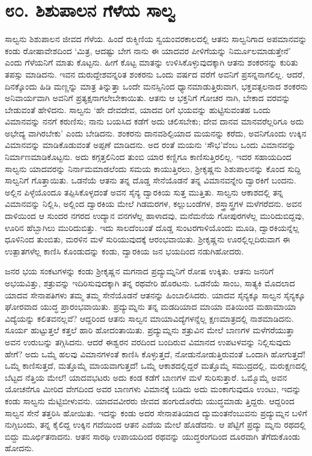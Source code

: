 
\chapter{೮೦. ಶಿಶುಪಾಲನ ಗೆಳೆಯ ಸಾಲ್ವ}

ಸಾಲ್ವನು ಶಿಶುಪಾಲನ ಜೀವದ ಗೆಳೆಯ. ಹಿಂದೆ ರುಕ್ಮಿಣಿಯ ಸ್ವಯಂವರಕಾಲದಲ್ಲಿ ಆತನು ಸಾಲ್ವನಿಗಾದ ಅಪಮಾನವನ್ನು ಕಂಡು ರೋಷಾವೇಶದಿಂದ ‘ಮಿತ್ರ, ಆದಷ್ಟು ಬೇಗ ನಾನು ಈ ಯಾದವರ ಪೀಳಿಗೆಯನ್ನು ನಿರ್ಮೂಲಮಾಡುತ್ತೇನೆ’ ಎಂದು ಗೆಳೆಯನಿಗೆ ಮಾತು ಕೊಟ್ಟನು. ಹೀಗೆ ಕೊಟ್ಟ ಮಾತನ್ನು ಉಳಿಸಿಕೊಳ್ಳುವುದಕ್ಕಾಗಿ ಆತನು ಶಂಕರನನ್ನು ಕುರಿತು ತಪಸ್ಸು ಮಾಡಿದನು. ಇವನ ದುರುದ್ದೇಶವನ್ನರಿತ ಶಂಕರನು ಒಂದು ವರ್ಷದ ವರೆಗೆ ಅವನಿಗೆ ಪ್ರಸನ್ನನಾಗಲಿಲ್ಲ. ಆದರೆ, ದಿನಕ್ಕೊಂದು ಹಿಡಿ ಮಣ್ಣನ್ನು ಮಾತ್ರ ತಿನ್ನುತ್ತಾ ಒಂದೇ ಮನಸ್ಸಿನಿಂದ ಧ್ಯಾನಮಾಡುತ್ತಿರುವಾಗ, ಭಕ್ತವತ್ಸಲನಾದ ಶಂಕರನು ಅನಿವಾರ್ಯವಾಗಿ ಅವನಿಗೆ ಪ್ರತ್ಯಕ್ಷನಾಗಲೇಬೇಕಾಯಿತು. ಆತನು ಆ ಭಕ್ತನಿಗೆ ಗೋಚರ ನಾಗಿ, ಬೇಕಾದ ವರವನ್ನು ಬೇಡುವಂತೆ ಹೇಳಿದನು. ಸಾಲ್ವನು ‘ಹೇ ದೇವದೇವ, ಯಾದವ ರಿಗೆ ಭಯವನ್ನು ಹುಟ್ಟಿಸುವಂತಹ ಒಂದು ವಿಮಾನವನ್ನು ನನಗೆ ಕರುಣಿಸು; ನಾನು ಬಯಸಿದ ಕಡೆಗೆ ಅದು ಚಲಿಸಬೇಕು; ದೇವ ದಾನವ ಮಾನವರೆಲ್ಲರಿಗೂ ಅದು ಅಭೇದ್ಯ ವಾಗಿರಬೇಕು’ ಎಂದು ಬೇಡಿದನು. ಶಂಕರನು ದಾನವಶಿಲ್ಪಿಯಾದ ಮಯನನ್ನು ಕರೆದು, ಅವನಿಗೊಂದು ಉಕ್ಕಿನ ವಿಮಾನವನ್ನು ಮಾಡಿಕೊಡುವಂತೆ ಅಪ್ಪಣೆ ಮಾಡಿದನು. ಅದ ರಂತೆ ಮಯನು ‘ಸೌಭ’ವೆಂಬ ಒಂದು ವಿಮಾನವನ್ನು ನಿರ್ಮಾಣಮಾಡಿಕೊಟ್ಟನು. ಅದು ಕಗ್ಗತ್ತಲಿನಿಂದ ತುಂಬಿ ಯಾರ ಕಣ್ಣಿಗೂ ಕಾಣಿಸುತ್ತಿರಲಿಲ್ಲ. ಇದರ ಸಹಾಯದಿಂದ ಸಾಲ್ವನು ಯಾದವರನ್ನು ನಿರ್ನಾಮಮಾಡಲೆಂದು ಸಮಯ ಕಾಯುತ್ತಿರಲು, ಶ್ರೀಕೃಷ್ಣನು ಶಿಶುಪಾಲನನ್ನು ಕೊಂದ ಸುದ್ದಿ ಸಾಲ್ವನಿಗೆ ಗೊತ್ತಾಯಿತು. ಒಡನೆಯೆ ಆತನು ತನ್ನ ದೊಡ್ಡ ಸೇನೆಯೊಡನೆ ತನ್ನ ವಿಮಾನವನ್ನೇರಿ ದ್ವಾರಕಿಗೆ ಬಂದನು. ಅಲ್ಲಿನ ಪಿಳ್ಳೆಯೊಂದೂ ತಪ್ಪಿಸಿಕೊಳ್ಳದಂತೆ ಅವನ ಸೈನ್ಯ ದ್ವಾರಕಿಯ ಸುತ್ತ ಮುತ್ತಿತು. ಸಾಲ್ವನು ಆಕಾಶದಲ್ಲಿ ತನ್ನ ವಿಮಾನವನ್ನು ನಿಲ್ಲಿಸಿ, ಅಲ್ಲಿಂದ ದ್ವಾರಕಿಯ ಮೇಲೆ ಗಿಡಮರಗಳ, ಕಲ್ಲುಬಂಡೆಗಳ, ಶಸ್ತ್ರಾಸ್ತ್ರಗಳ ಮಳೆಗರೆದನು. ಅವನ ದಾಳಿಯಿಂದ ಆ ಸುಂದರ ನಗರದ ಉದ್ಯಾನ ವನಗಳೆಲ್ಲ ಹಾಳಾದವು, ಮನೆಮನೆಯ ಗೋಪುರಗಳೆಲ್ಲ ಮುರಿದುಬಿದ್ದವು, ಊರಿನ ಹೆಬ್ಬಾಗಿಲು ಮುರಿದುಬಿತ್ತು. ಇದು ಸಾಲದೆಂಬಂತೆ ದೊಡ್ಡ ಸುಂಟರಗಾಳಿಯೊಂದು ಮೂಡಿ, ದ್ವಾರಕಿಯನ್ನೆಲ್ಲ ಧೂಳಿನಿಂದ ತುಂಬಿತು, ಮರಳಿನ ಮಳೆ ಸುರಿಯುವುದಕ್ಕೆ ಆರಂಭವಾಯಿತು. ಶ್ರೀಕೃಷ್ಣನು ಊರಲ್ಲಿಲ್ಲದಿರುವಾಗ ಈ ಉತ್ಪಾತಗಳೆಲ್ಲ ಕಾಣಿಸಿ ಕೊಂಡುದನ್ನು ಕಂಡು, ದ್ವಾರಕಿಯ ಜನ ಭಯದಿಂದ ನಡುಗಿಹೋದರು.

ಜನರ ಭಯ ಸಂಕಟಗಳನ್ನು ಕಂಡು ಶ್ರೀಕೃಷ್ಣನ ಮಗನಾದ ಪ್ರದ್ಯುಮ್ನನಿಗೆ ರೋಷ ಉಕ್ಕಿತು. ಆತನು ಜನರಿಗೆ ಅಭಯವಿತ್ತು, ಶತ್ರುವನ್ನು ಇದಿರಿಸುವುದಕ್ಕಾಗಿ ತನ್ನ ರಥವೇರಿ ಹೊರಟನು. ಒಡನೆಯೆ ಸಾಂಬ, ಸಾತ್ಯಕಿ ಮೊದಲಾದ ಯಾದವ ಸೇನಾಪತಿಗಳು ತಮ್ಮ ತಮ್ಮ ಸೇನೆಯೊಡನೆ ಆತನನ್ನು ಹಿಂಬಾಲಿಸಿದರು. ಯಾದವ ಸೈನ್ಯಕ್ಕೂ ಸಾಲ್ವನ ಸೈನ್ಯಕ್ಕೂ ಘೋರವಾದ ಯುದ್ಧ ಪ್ರಾರಂಭವಾಯಿತು. ಪ್ರದ್ಯುಮ್ನನು ತನ್ನ ಮಡದಿಯಾದ ಮಾಯಾ ವತಿಯಿಂದ ಮಹಾಮಾಯಾ ವಿದ್ಯೆಯನ್ನು ಕಲಿತವನಲ್ಲವೆ? ಆದ್ದರಿಂದ ಆತನು ಸಾಲ್ವನ ಮಾಯಾವಿದ್ಯೆಗಳನ್ನೆಲ್ಲ ಕ್ಷಣಮಾತ್ರದಲ್ಲಿ ನಾಶಮಾಡಿದನು. ಸೂರ್ಯ ಹುಟ್ಟುತ್ತಲೆ ಕತ್ತಲೆ ಹಾರಿ ಹೋದಂತಾಯಿತು. ಪ್ರದ್ಯುಮ್ನನು ಶತ್ರುವಿನ ಮೇಲೆ ಬಾಣಗಳ ಮಳೆಗರೆಯುತ್ತಾ ಅವನ ಉರುಬನ್ನು ತಗ್ಗಿಸಿದನು. ಆದರೆ ಈಶ್ವರನ ವರದಿಂದ ಬಂದಿರುವ ವಿಮಾನದ ಉಪಟಳವನ್ನು ನಿಲ್ಲಿಸುವುದು ಹೇಗೆ? ಅದು ಒಮ್ಮೆ ಹಲವು ವಿಮಾನಗಳಂತೆ ಕಾಣಿಸಿ ಕೊಳ್ಳುತ್ತದೆ, ನೋಡುನೋಡುತ್ತಿರುವಂತೆ ಒಂದಾಗಿ ಹೋಗುತ್ತದೆ! ಒಮ್ಮೆ ಕಾಣಿಸುತ್ತದೆ, ಮತ್ತೊಮ್ಮೆ ಮಾಯವಾಗುತ್ತದೆ! ಒಮ್ಮೆ ಆಕಾಶದಲ್ಲಿದ್ದರೆ ಮತ್ತೊಮ್ಮೆ ಸಮುದ್ರದಲ್ಲಿ, ಮರುಕ್ಷಣದಲ್ಲಿ ಬೆಟ್ಟದ ನೆತ್ತಿಯ ಮೇಲೆ! ಯಾದವಭಟರು ಅದು ಕಂಡ ಕಡೆಗೆ ಬಾಣಗಳ ಮಳೆ ಸುರಿಸುತ್ತಾರೆ. ಒಮ್ಮೊಮ್ಮೆ ಅವನ ಯೋಚನೆಗೂ ಮೀರಿದ ವೇಗದಿಂದ ಅವರ ಬಾಣಗಳು ವಿಮಾನಕ್ಕೆ ಬಡಿದು ಅದು ಮಂಕಾಗುವುದೂ ಉಂಟು, ಇದನ್ನು ಕಂಡು ಸಾಲ್ವನು ಮೆಟ್ಟಿಬೀಳುವನು. ಯಾದವವೀರರು ಜೀವದ ಹಂಗುದೊರೆದು ಯುದ್ಧಮಾಡು ತ್ತಿದ್ದರು. ಆದ್ದರಿಂದ ಸಾಲ್ವನ ಸೇನೆ ತತ್ತರಿಸಿ ಹೋಯಿತು. ಇದನ್ನು ಕಂಡು ಅದರ ಸೇನಾಪತಿಯಾದ ದ್ಯುಮಂತನೆಂಬುವನು ಪ್ರದ್ಯುಮ್ನನ ಬಳಿಗೆ ನುಗ್ಗಿಬಂದು, ತನ್ನ ಕೈಲಿದ್ದ ಉಕ್ಕಿನ ಗದೆಯಿಂದ ಆತನ ಎದೆಯ ಮೇಲೆ ಹೊಡೆದನು. ಆ ಪೆಟ್ಟಿಗೆ ಪ್ರದ್ಯು ಮ್ನನು ರಥದಲ್ಲಿ ಬಿದ್ದು ಮೂರ್ಛಿತನಾದನು. ಆತನ ಸಾರಥಿ ಉಪಾಯದಿಂದ ರಥವನ್ನು ಯುದ್ಧರಂಗದಿಂದ ದೂರವಾಗಿ ತೆಗೆದುಕೊಂಡು ಹೋದನು.

